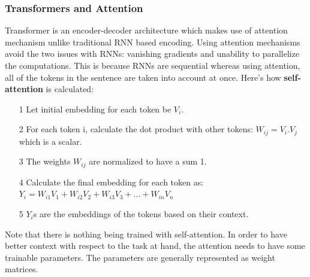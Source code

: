 \subsubsection{Transformers and Attention}
Transformer is an encoder-decoder architecture which makes use of attention
mechanism unlike traditional RNN based encoding. Using attention mechanisms
avoid the two issues with RNNs: vanishing gradients and unability to
parallelize the computations. This is because RNNs are sequential whereas using
attention, all of the tokens in the sentence are taken into account at once.
Here's how \textbf{self-attention} is calculated:
\\
\begin{itemize}
    \item[1] Let initial embedding for each token be $V_i$.\\
    \item[2] For each token {i}, calculate the dot product with other tokens:
            $W_{ij} = V_i . V_j$ which is a scalar.
    \item[3] The weights $W_{ij}$ are normalized to have a sum 1.
    \item[4] Calculate the final embedding for each token as:
            $Y_i = W_{i1} V_1 + W_{i2} V_2 + W_{i3} V_3 + ... + W_{in} V_n$
    \item[5] $Y_i$s are the embeddings of the tokens based on their context.
\end{itemize}
Note that there is nothing being trained with self-attention. In order to have
better context with respect to the task at hand, the attention needs to have
some trainable parameters. The parameters are generally represented as weight
matrices.


